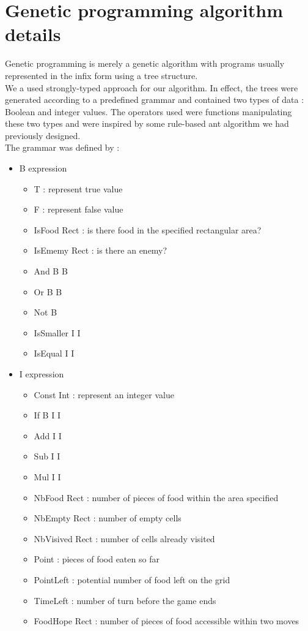 \documentclass[10pt,a4paper]{article}
\begin{document}
\section{Genetic programming algorithm details}

Genetic programming is merely a genetic algorithm with programs
usually represented in the infix form using a tree structure.\\

We a used strongly-typed approach for our algorithm. In effect, the
trees were generated according to a predefined grammar and contained
two types of data : Boolean and integer values. The operators used
were functions manipulating these two types and were inspired by some
rule-based ant algorithm we had previously designed.\\

The grammar was defined by :
\begin{itemize}
\item B expression
  \begin{itemize}
    \item T : represent true value 
    \item F : represent false value
    \item IsFood Rect : is there food in the specified rectangular area?
    \item IsEmemy Rect : is there an enemy?
    \item And B B
    \item Or B B
    \item Not B
    \item IsSmaller I I
    \item IsEqual I I
  \end{itemize}
\item I expression
  \begin{itemize}
  \item Const Int : represent an integer value
  \item If B I I
  \item Add I I
  \item Sub I I
  \item Mul I I
  \item NbFood Rect : number of pieces of food within the area specified
  \item NbEmpty Rect : number of empty cells
  \item NbVisived Rect : number of cells already visited
  \item Point : pieces of food eaten so far
  \item PointLeft : potential number of food left on the grid
  \item TimeLeft : number of turn before the game ends
  \item FoodHope Rect : number of pieces of food accessible within two moves
  \end{itemize}
\end{itemize}
\end{document}

